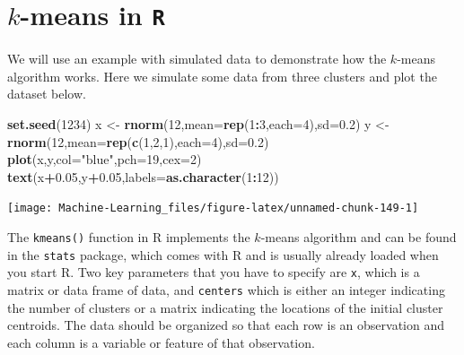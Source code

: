 \documentclass[]{book}
\newenvironment{Shaded}{\begin{snugshade}}{\end{snugshade}}
\newcommand{\KeywordTok}[1]{\textcolor[rgb]{0.13,0.29,0.53}{\textbf{#1}}}
\newcommand{\DataTypeTok}[1]{\textcolor[rgb]{0.13,0.29,0.53}{#1}}
\newcommand{\DecValTok}[1]{\textcolor[rgb]{0.00,0.00,0.81}{#1}}
\newcommand{\FloatTok}[1]{\textcolor[rgb]{0.00,0.00,0.81}{#1}}
\newcommand{\StringTok}[1]{\textcolor[rgb]{0.31,0.60,0.02}{#1}}
\newcommand{\OperatorTok}[1]{\textcolor[rgb]{0.81,0.36,0.00}{\textbf{#1}}}
\newcommand{\NormalTok}[1]{#1}
\let\origfigure\figure
\let\endorigfigure\endfigure
\renewenvironment{figure}[1][2] {
    \expandafter\origfigure\expandafter[H]
} {
    \endorigfigure
}
\begin{document}
\section{\texorpdfstring{\(k\)-means in
\texttt{R}}{k-means in R}}\label{k-means-in-r}

We will use an example with simulated data to demonstrate how the
\(k\)-means algorithm works. Here we simulate some data from three
clusters and plot the dataset below.

\begin{Shaded}
\begin{Highlighting}[]
\KeywordTok{set.seed}\NormalTok{(}\DecValTok{1234}\NormalTok{)}
\NormalTok{x <-}\StringTok{ }\KeywordTok{rnorm}\NormalTok{(}\DecValTok{12}\NormalTok{,}\DataTypeTok{mean=}\KeywordTok{rep}\NormalTok{(}\DecValTok{1}\OperatorTok{:}\DecValTok{3}\NormalTok{,}\DataTypeTok{each=}\DecValTok{4}\NormalTok{),}\DataTypeTok{sd=}\FloatTok{0.2}\NormalTok{)}
\NormalTok{y <-}\StringTok{ }\KeywordTok{rnorm}\NormalTok{(}\DecValTok{12}\NormalTok{,}\DataTypeTok{mean=}\KeywordTok{rep}\NormalTok{(}\KeywordTok{c}\NormalTok{(}\DecValTok{1}\NormalTok{,}\DecValTok{2}\NormalTok{,}\DecValTok{1}\NormalTok{),}\DataTypeTok{each=}\DecValTok{4}\NormalTok{),}\DataTypeTok{sd=}\FloatTok{0.2}\NormalTok{)}
\KeywordTok{plot}\NormalTok{(x,y,}\DataTypeTok{col=}\StringTok{"blue"}\NormalTok{,}\DataTypeTok{pch=}\DecValTok{19}\NormalTok{,}\DataTypeTok{cex=}\DecValTok{2}\NormalTok{)}
\KeywordTok{text}\NormalTok{(x}\OperatorTok{+}\FloatTok{0.05}\NormalTok{,y}\OperatorTok{+}\FloatTok{0.05}\NormalTok{,}\DataTypeTok{labels=}\KeywordTok{as.character}\NormalTok{(}\DecValTok{1}\OperatorTok{:}\DecValTok{12}\NormalTok{))}
\end{Highlighting}
\end{Shaded}

\begin{figure}

{\centering \texttt{[image: Machine-Learning\_files/figure-latex/unnamed-chunk-149-1]} 

}

\caption{Simulated dataset}\label{fig:unnamed-chunk-149}
\end{figure}

The \texttt{kmeans()} function in R implements the \(k\)-means algorithm
and can be found in the \texttt{stats} package, which comes with R and
is usually already loaded when you start R. Two key parameters that you
have to specify are \texttt{x}, which is a matrix or data frame of data,
and \texttt{centers} which is either an integer indicating the number of
clusters or a matrix indicating the locations of the initial cluster
centroids. The data should be organized so that each row is an
observation and each column is a variable or feature of that
observation.
\end{document}
